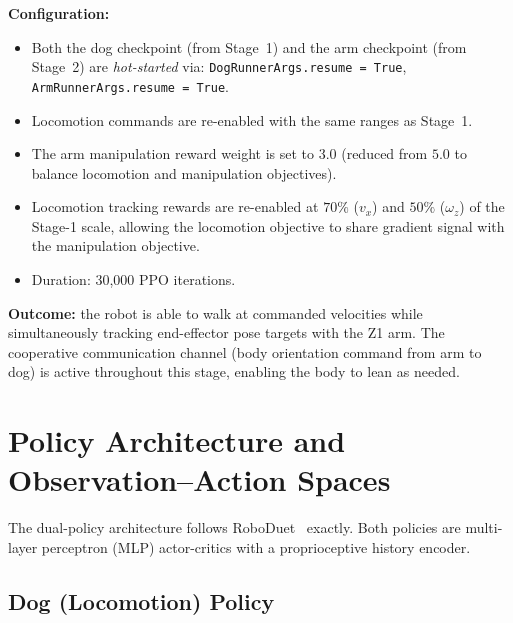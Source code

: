 \textbf{Configuration:}
\begin{itemize}
  \item Both the dog checkpoint (from Stage~1) and the arm checkpoint
        (from Stage~2) are \emph{hot-started} via:
        \texttt{DogRunnerArgs.resume = True},
        \texttt{ArmRunnerArgs.resume = True}.
  \item Locomotion commands are re-enabled with the same ranges as Stage~1.
  \item The arm manipulation reward weight is set to $3.0$
        (reduced from $5.0$ to balance locomotion and manipulation objectives).
  \item Locomotion tracking rewards are re-enabled at $70\%$ ($v_x$)
        and $50\%$ ($\omega_z$) of the Stage-1 scale, allowing the locomotion
        objective to share gradient signal with the manipulation objective.
  \item Duration: 30,000 PPO iterations.
\end{itemize}

\textbf{Outcome:} the robot is able to walk at commanded velocities while
simultaneously tracking end-effector pose targets with the Z1 arm.
The cooperative communication channel (body orientation command from arm
to dog) is active throughout this stage, enabling the body to lean as needed.

\section{Policy Architecture and Observation--Action Spaces}

The dual-policy architecture follows RoboDuet~\cite{pan2024roboduet} exactly.
Both policies are multi-layer perceptron (MLP) actor-critics with a
proprioceptive history encoder.

\subsection{Dog (Locomotion) Policy}

